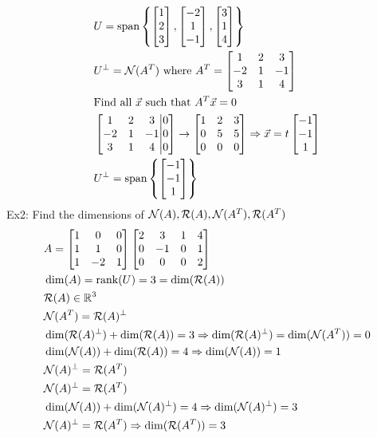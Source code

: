\documentclass[11pt, fleqn]{article}
\begin{document}
\begin{align*}
    &U=\spann\brcurly{\matrixx{1\\2\\3},\matrixx{-2\\1\\-1},\matrixx{3\\1\\4}}\\
    &U^\perp=\Null(A^T)\text{ where }A^T=\matrixx{1 & 2 & 3\\ -2 & 1 & -1\\ 3 & 1 &4}\\
    &\text{Find all $\vec{x}$ such that $A^T\vec{x}=0$}\\
    &\augmatrix{1 & 2& 3\\ -2 & 1 & -1\\ 3 & 1 & 4}{0\\0\\0}\to\matrixx{1 & 2 & 3\\ 0 & 5 & 5\\ 0 & 0 & 0}\Ra \vec{x}=t\matrixx{-1\\-1\\1}\\
    &U^\perp=\spann\brcurly{\matrixx{-1\\-1\\1}}
\end{align*}
Ex2: Find the dimensions of $\mathcal{N}(A),\mathcal{R}(A),\mathcal{N}(A^T),\mathcal{R}(A^T)$
\begin{align*}
    &A=\matrixx{1 &0 & 0\\ 1& 1 & 0\\ 1& -2 & 1}\matrixx{2 & 3& 1 & 4\\ 0 & -1 & 0 & 1\\ 0 & 0 & 0 &2}\\
    &\dim(A)=\rank(U)=3=\dim(\Range(A))\\
    &\Range(A)\in\R^3\\
    &\Null(A^T)=\Range(A)^\perp\\
    &\dim(\Range(A)^\perp)+\dim(\Range(A))=3\Ra \dim(\Range(A)^\perp)=\dim(\Null(A^T))=0\\
    &\dim(\Null(A))+\dim(\Range(A))=4\Ra \dim(\Null(A))=1\\
    &\Null(A)^\perp=\Range(A^T)\\
    &\Null(A)^\perp=\Range(A^T)\\
    &\dim(\Null(A))+\dim(\Null(A)^\perp)=4\Ra \dim(\Null(A)^\perp)=3\\
    &\Null(A)^\perp=\Range(A^T)\Ra \dim(\Range(A^T))=3
\end{align*}
\end{document}
